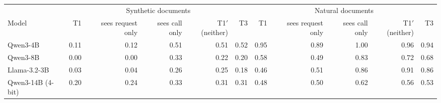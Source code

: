 \begin{tabular}{lrrrrrrrrrr}
\toprule
& \multicolumn{5}{c}{Synthetic documents} & \multicolumn{5}{c}{Natural documents} \\
\cmidrule(lr){2-6}\cmidrule(lr){7-11}
Model & T1 & sees request only & sees call only & T1$'$ (neither) & T3 & T1 & sees request only & sees call only & T1$'$ (neither) & T3 \\
\midrule
Qwen3-4B & 0.11 & 0.12 & 0.51 & 0.51 & 0.52 & 0.95 & 0.89 & 1.00 & 0.96 & 0.94 \\
Qwen3-8B & 0.00 & 0.00 & 0.33 & 0.22 & 0.20 & 0.58 & 0.49 & 0.83 & 0.72 & 0.68 \\
Llama-3.2-3B & 0.03 & 0.04 & 0.26 & 0.25 & 0.18 & 0.46 & 0.51 & 0.86 & 0.91 & 0.86 \\
Qwen3-14B (4-bit) & 0.20 & 0.24 & 0.33 & 0.31 & 0.31 & 0.48 & 0.50 & 0.62 & 0.56 & 0.53 \\
\bottomrule
\end{tabular}

